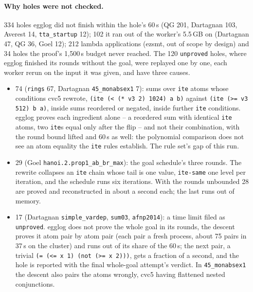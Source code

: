 \documentclass[11pt,a4paper]{article}
\newcommand{\code}[1]{\texttt{#1}}
\begin{document}
\paragraph{Why holes were not checked.} 334 holes egglog did not finish
within the hole's 60\,s (QG 201, Dartagnan 103, Averest 14,
\code{tta\_startup} 12); 102 it ran out of the worker's 5.5\,GB on
(Dartagnan 47, QG 36, Goel 12); 212 lambda applications (ezsmt, out of
scope by design) and 34 holes the proof's 1,500\,s budget never reached.
The 120 \code{unproved} holes, where egglog finished its rounds without
the goal, were replayed one by one, each worker rerun on the input it
was given, and have three causes.
\begin{itemize}
  \item 74 (\code{rings} 67, Dartagnan \code{45\_monabsex1} 7): sums over
    \code{ite} atoms whose conditions cvc5 rewrote, \code{(ite (< (* v3 2)
    1024) a b)} against \code{(ite (>= v3 512) b a)}, inside sums reordered
    or negated, inside further \code{ite} conditions. egglog proves each
    ingredient alone -- a reordered sum with identical \code{ite} atoms,
    two \code{ite}s equal only after the flip -- and not their combination,
    with the round bound lifted and 60\,s as well: the polynomial
    comparison does not see an atom equality the \code{ite} rules
    establish. The rule set's gap of this run.
  \item 29 (Goel \code{hanoi.2.prop1\_ab\_br\_max}): the goal schedule's
    three rounds. The rewrite collapses an \code{ite} chain whose tail is
    one value, \code{ite-same} one level per iteration, and the schedule
    runs six iterations. With the rounds unbounded 28 are proved and
    reconstructed in about a second each; the last runs out of memory.
  \item 17 (Dartagnan \code{simple\_vardep}, \code{sum03}, \code{afnp2014}):
    a time limit filed as \code{unproved}. egglog does not prove the whole
    goal in its rounds, the descent proves it atom pair by atom pair (each
    pair a fresh process, about 75 pairs in 37\,s on the cluster) and runs
    out of its share of the 60\,s; the next pair, a trivial
    \code{(= (<= x 1) (not (>= x 2)))}, gets a fraction of a second, and
    the hole is reported with the final whole-goal attempt's verdict. In
    \code{45\_monabsex1} the descent also pairs the atoms wrongly, cvc5
    having flattened nested conjunctions.
\end{itemize}
\end{document}
